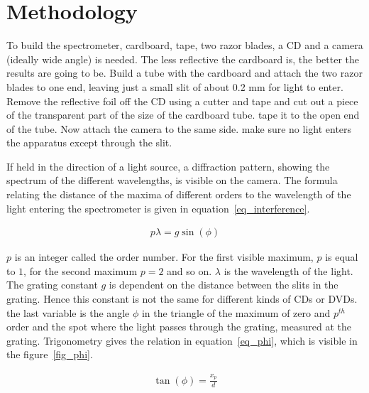 \section{Methodology} \label{sec_methodology}

    To build the spectrometer, cardboard, tape, two razor blades, a CD and a camera (ideally wide angle) is needed.
    The less reflective the cardboard is, the better the results are going to be.
    Build a tube with the cardboard and attach the two razor blades to one end, leaving just a small slit of about 0.2 mm for light to enter.
    Remove the reflective foil off the CD using a cutter and tape and cut out a piece of the transparent part of the size of the cardboard tube.
    tape it to the open end of the tube.
    Now attach the camera to the same side.
    make sure no light enters the apparatus except through the slit.

    If held in the direction of a light source, a diffraction pattern, showing the spectrum of the different wavelengths, is visible on the camera.
    The formula relating the distance of the maxima of different orders to the wavelength of the light entering the spectrometer is given in equation~\eqref{eq_interference}.

    \begin{align}
        p \lambda = g \sin(\phi) \label{eq_interference}
    \end{align}

    $p$ is an integer called the order number. For the first visible maximum, $p$ is equal to $1$, for the second maximum $p = 2$ and so on.
    $\lambda$ is the wavelength of the light.
    The grating constant $g$ is dependent on the distance between the slits in the grating.
    Hence this constant is not the same for different kinds of CDs or DVDs.
    the last variable is the angle $\phi$ in the triangle of the maximum of zero and $p^{th}$ order and the spot where the light passes through the grating, measured at the grating.
    Trigonometry gives the relation in equation~\eqref{eq_phi}, which is visible in the figure~\ref{fig_phi}.
    
    \begin{align}
        \tan(\phi) = \frac{x_p}{d} \label{eq_phi}
    \end{align}

